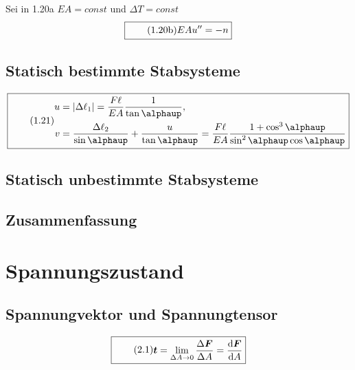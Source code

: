 \documentclass[11pt]{article}
\newcommand{\1}{ {\mathds{1}} }
\newcommand{\abs}[1]{\lvert#1\rvert}
\renewcommand{\alpha  }{\alphaup   }
\begin{document}
		Sei in 1.20a $EA = const$ und $\Delta T = const$
		\begin{equation}
			\boxed{
				\tag{1.20b}
				\begin{split}
					EA u''
					=
					-n
				\end{split}
			}
		\end{equation}


		\subsection{Statisch bestimmte Stabsysteme}

		\begin{equation}
			\boxed{
				\tag{1.21}
				\begin{split}
					u
					&=
					\abs{\Delta\ell_1}
					=
					\frac{F\ell}{EA}
					\frac{1}{\tan{\alpha}}
					,\\
					v
					&=
					\frac{\Delta\ell_2}{\sin{\alpha}}
					+
					\frac{u}{\tan{\alpha}}
					=
					\frac{F\ell}{EA}
					\frac{1 + \cos^3\alpha}{\sin^2\alpha \cos \alpha}
				\end{split}
			}
		\end{equation}


		\subsection{Statisch unbestimmte Stabsysteme}

		\subsection{Zusammenfassung}
		
		\section{Spannungszustand}
		\subsection{Spannungvektor und Spannungtensor}

		\begin{equation}
			\boxed{
				\tag{2.1}
				\begin{split}
					\boldsymbol{t}
					=
					\lim_{\Delta A \rightarrow 0}
					\frac{\Delta \boldsymbol{F}}{\Delta A}
					=
					\frac{\text{d}\boldsymbol{F}}{\text{d}A}
				\end{split}
			}
		\end{equation}
\end{document}
